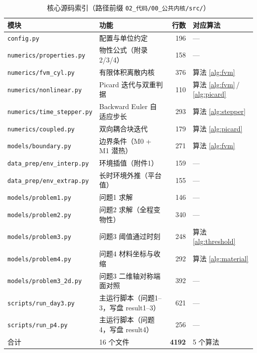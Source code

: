 \begin{table}[H]
  \centering
  \caption{核心源码索引（路径前缀 \texttt{02\_代码/00\_公共内核/src/}）}
  \label{tab:srcindex}
  \footnotesize
  \begin{tabularx}{\textwidth}{@{}llrX@{}}
    \toprule
    模块 & 功能 & 行数 & 对应算法 \\
    \midrule
    \texttt{config.py}          & 配置与单位约定            & 196 & --- \\
    \texttt{numerics/properties.py} & 物性公式（附录2/3/4）& 158 & --- \\
    \texttt{numerics/fvm\_cyl.py}   & 有限体积离散内核     & 376 & 算法 \ref{alg:fvm} \\
    \texttt{numerics/nonlinear.py}  & Picard 迭代与双重判据 & 110 & 算法 \ref{alg:fvm}\,/\,\ref{alg:picard} \\
    \texttt{numerics/time\_stepper.py} & Backward Euler 自适应步长 & 293 & 算法 \ref{alg:stepper} \\
    \texttt{numerics/coupled.py}    & 双向耦合块迭代       & 179 & 算法 \ref{alg:picard} \\
    \texttt{models/boundary.py}     & 边界条件（M0 + M1 潜热） & 271 & 算法 \ref{alg:fvm} \\
    \texttt{data\_prep/env\_interp.py}  & 环境插值（附件1） & 159 & --- \\
    \texttt{data\_prep/env\_extrap.py}  & 长时环境外推（平台值） & 155 & --- \\
    \texttt{models/problem1.py}     & 问题1 求解           & 146 & --- \\
    \texttt{models/problem2.py}     & 问题2 求解（全程变物性） & 340 & --- \\
    \texttt{models/problem3.py}     & 问题3 阈值通过时刻   & 248 & 算法 \ref{alg:threshold} \\
    \texttt{models/problem4.py}     & 问题4 材料坐标与收缩 & 292 & 算法 \ref{alg:material} \\
    \texttt{models/problem3\_2d.py} & 问题3 二维轴对称端面对照 & 392 & --- \\
    \texttt{scripts/run\_day3.py}   & 主运行脚本（问题1--3，写盘 result1--3） & 621 & --- \\
    \texttt{scripts/run\_p4.py}     & 主运行脚本（问题4，写盘 result4） & 256 & --- \\
    \midrule
    合计 & 16 个文件 & \textbf{4192} & 5 个算法 \\
    \bottomrule
  \end{tabularx}
\end{table}

